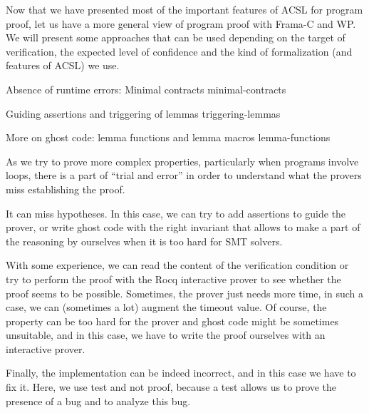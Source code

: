 Now that we have presented most of the important features of ACSL for program
proof, let us have a more general view of program proof with Frama-C and WP. We
will present some approaches that can be used depending on the target of
verification, the expected level of confidence and the kind of formalization
(and features of ACSL) we use.



\begin{levelTwo}
  {Absence of runtime errors: Minimal contracts}
  {minimal-contracts}
\end{levelTwo}

\begin{levelTwo}
  {Guiding assertions and triggering of lemmas}
  {triggering-lemmas}
\end{levelTwo}

\begin{levelTwo}
  {More on ghost code: lemma functions and lemma macros}
  {lemma-functions}
\end{levelTwo}



\horizontalLine
\newpage

As we try to prove more complex properties, particularly when
programs involve loops, there is a part of ``trial and error'' in
order to understand what the provers miss establishing the proof.

It can miss hypotheses. In this case, we can try to add assertions to
guide the prover, or write ghost code with the right invariant that
allows to make a part of the reasoning by ourselves when it is too hard
for SMT solvers.

With some experience, we can read the content of the verification condition or
try to perform the proof with the Rocq interactive prover to see whether
the proof seems to be possible. Sometimes, the prover just needs more
time, in such a case, we can (sometimes a lot) augment the timeout value.
Of course, the property can be too hard for the prover and ghost code
might be sometimes unsuitable, and in this case, we have to write the
proof ourselves with an interactive prover.

Finally, the implementation can be indeed incorrect, and in this case we
have to fix it. Here, we use test and not proof, because a test
allows us to prove the presence of a bug and to analyze this bug.
